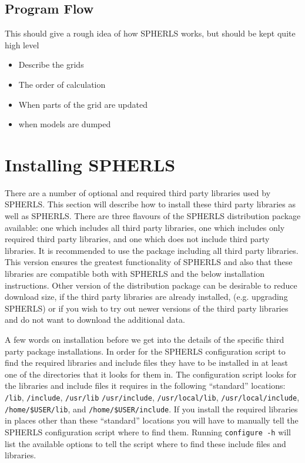 \documentclass[12pt,a4paper]{book}
\begin{document}
\section{Program Flow}
This should give a rough idea of how SPHERLS works, but should be kept quite high level
\begin{itemize}
\item Describe the grids
\item The order of calculation
\item When parts of the grid are updated
\item when models are dumped
\end{itemize}

\chapter{Installing SPHERLS}

There are a number of optional and required third party libraries used by SPHERLS. This section will describe how to install these third party libraries as well as SPHERLS. There are three flavours of the SPHERLS distribution package available: one which includes all third party libraries, one which includes only required third party libraries, and one which does not include third party libraries. It is recommended to use the package including all third party libraries. This version ensures the greatest functionality of SPHERLS and also that these libraries are compatible both with SPHERLS and the below installation instructions. Other version of the distribution package can be desirable to reduce download size, if the third party libraries are already installed, (e.g. upgrading SPHERLS) or if you wish to try out newer versions of the third party libraries and do not want to download the additional data.

A few words on installation before we get into the details of the specific third party package installations. In order for the SPHERLS configuration script to find the required libraries and include files they have to be installed in at least one of the directories that it looks for them in. The configuration script looks for the libraries and include files it requires in the following ``standard'' locations: {\tt /lib}, {\tt /include}, {\tt /usr/\-lib} {\tt /usr/\-include}, {\tt /usr/local/lib}, {\tt /usr/\-local/\-include}, {\tt /home/\-\$USER/\-lib}, and {\tt /home/\-\$USER/\-include}. If you install the required libraries in places other than these ``standard'' locations you will have to manually tell the SPHERLS configuration script where to find them. Running {\tt configure -h} will list the available options to tell the script where to find these include files and libraries.
\end{document}
